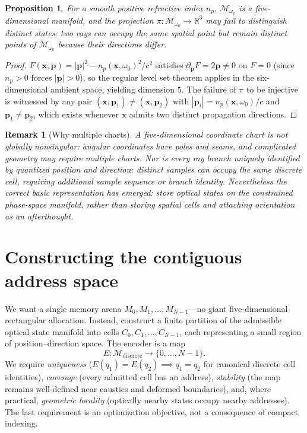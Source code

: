 \documentclass[11pt]{article}
\newtheorem{proposition}[theorem]{Proposition}
\newtheorem{remark}[theorem]{Remark}
\newcommand{\R}{\mathbb{R}}
\newcommand{\xv}{\mathbf{x}}
\newcommand{\pv}{\mathbf{p}}
\newcommand{\Mopt}{\mathcal{M}_{\omega_0}}
\begin{document}
\begin{proposition}\label{prop:manifold}
For a smooth positive refractive index $n_p$, $\Mopt$ is a five-dimensional manifold,
and the projection $\pi:\Mopt \to \R^3$ may fail to distinguish distinct states: two
rays can occupy the same spatial point but remain distinct points of $\Mopt$ because
their directions differ.
\end{proposition}
\begin{proof}
$F(\xv,\pv) = |\pv|^2 - n_p(\xv,\omega_0)^2/c^2$ satisfies
$\partial_{\pv} F = 2\pv \neq 0$ on $F=0$ (since $n_p>0$ forces $|\pv|>0$), so the
regular level set theorem applies in the six-dimensional ambient space, yielding
dimension $5$. The failure of $\pi$ to be injective is witnessed by any pair
$(\xv,\pv_1)\neq(\xv,\pv_2)$ with $|\pv_i| = n_p(\xv,\omega_0)/c$ and $\pv_1 \neq\pv_2$,
which exists whenever $\xv$ admits two distinct propagation directions.
\end{proof}

\begin{remark}[Why multiple charts]\label{rem:charts}
A five-dimensional coordinate chart is not globally nonsingular: angular coordinates
have poles and seams, and complicated geometry may require multiple charts. Nor is
every ray branch uniquely identified by quantized position and direction: distinct
samples can occupy the same discrete cell, requiring additional sample sequence or
branch identity. Nevertheless the correct basic representation has emerged: store
optical states on the constrained phase-space manifold, rather than storing spatial
cells and attaching orientation as an afterthought.
\end{remark}

\section{Constructing the contiguous address space}\label{sec:addressing}

We want a single memory arena $M_0, M_1, \ldots, M_{N-1}$---no giant five-dimensional
rectangular allocation. Instead, construct a finite partition of the admissible optical
state manifold into cells $C_0, C_1, \ldots, C_{N-1}$, each representing a small region
of position--direction space. The encoder is a map
\begin{equation}
E : \mathcal{M}_{\mathrm{discrete}} \rightarrow \{0,\ldots,N-1\}.
\end{equation}
We require \emph{uniqueness} ($E(q_1)=E(q_2) \implies q_1=q_2$ for canonical discrete
cell identities), \emph{coverage} (every admitted cell has an address), \emph{stability}
(the map remains well-defined near caustics and deformed boundaries), and, where
practical, \emph{geometric locality} (optically nearby states occupy nearby addresses).
The last requirement is an optimization objective, not a consequence of compact
indexing.
\end{document}

